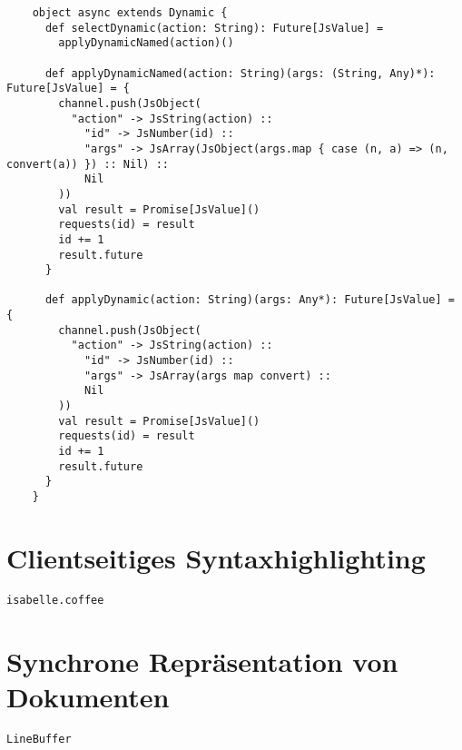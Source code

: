\begin{lstlisting}
    object async extends Dynamic {
      def selectDynamic(action: String): Future[JsValue] =
        applyDynamicNamed(action)()

      def applyDynamicNamed(action: String)(args: (String, Any)*): Future[JsValue] = {
        channel.push(JsObject(
          "action" -> JsString(action) ::
            "id" -> JsNumber(id) ::
            "args" -> JsArray(JsObject(args.map { case (n, a) => (n, convert(a)) }) :: Nil) ::
            Nil
        ))
        val result = Promise[JsValue]()
        requests(id) = result
        id += 1
        result.future
      }

      def applyDynamic(action: String)(args: Any*): Future[JsValue] = {
        channel.push(JsObject(
          "action" -> JsString(action) ::
            "id" -> JsNumber(id) ::
            "args" -> JsArray(args map convert) ::
            Nil
        ))
        val result = Promise[JsValue]()
        requests(id) = result
        id += 1
        result.future
      }
    }
\end{lstlisting}

\section{Clientseitiges Syntaxhighlighting}
\label{sec:syntax}

\texttt{isabelle.coffee}

\section{Synchrone Repräsentation von Dokumenten}
\label{sec:linebuffer}

\texttt{LineBuffer}